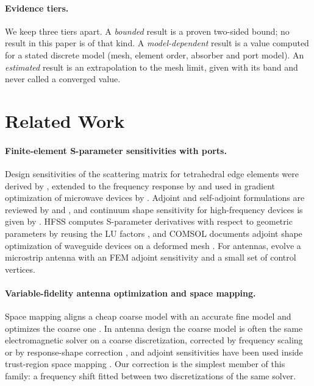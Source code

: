 \documentclass{anvil-paper}
\begin{document}
\paragraph{Evidence tiers.}
We keep three tiers apart. A \emph{bounded} result is a proven two-sided
bound; no result in this paper is of that kind. A \emph{model-dependent}
result is a value computed for a stated discrete model (mesh, element order,
absorber and port model). An \emph{estimated} result is an extrapolation to
the mesh limit, given with its band and never called a converged value.

\section{Related Work}
\label{sec:related}

\paragraph{Finite-element S-parameter sensitivities with ports.}
Design sensitivities of the scattering matrix for tetrahedral edge elements
were derived by \citet{webb2000design}, extended to the frequency response
by \citet{webb2002design} and used in gradient optimization of microwave
devices by \citet{nair2003optimization}. Adjoint and self-adjoint
formulations are reviewed by \citet{nikolova2004adjoint} and
\citet{nikolova2006network}, and continuum shape sensitivity for
high-frequency devices is given by \citet{choi2011generalized}. HFSS computes
S-parameter derivatives with respect to geometric parameters by reusing the
LU factors \citep{ansys_hfss_derivatives,vardapetyan2008sensitivity}, and
COMSOL documents adjoint shape optimization of waveguide devices on a
deformed mesh \citep{comsol_sensitivity_method,jensen2022comsolshape}. For
antennas, \citet{ghassemi2013antenna} evolve a microstrip antenna with an FEM
adjoint sensitivity and a small set of control vertices.

\paragraph{Variable-fidelity antenna optimization and space mapping.}
Space mapping aligns a cheap coarse model with an accurate fine model and
optimizes the coarse one \citep{bandler1994space,bandler2004space,koziel2006framework}.
In antenna design the coarse model is often the same electromagnetic solver
on a coarse discretization, corrected by frequency scaling or by
response-shape correction \citep{koziel2010sprp,koziel2014antenna}, and
adjoint sensitivities have been used inside trust-region space mapping
\citep{koziel2013reliable}. Our correction is the simplest member of this
family: a frequency shift fitted between two discretizations of the same
solver.
\end{document}
